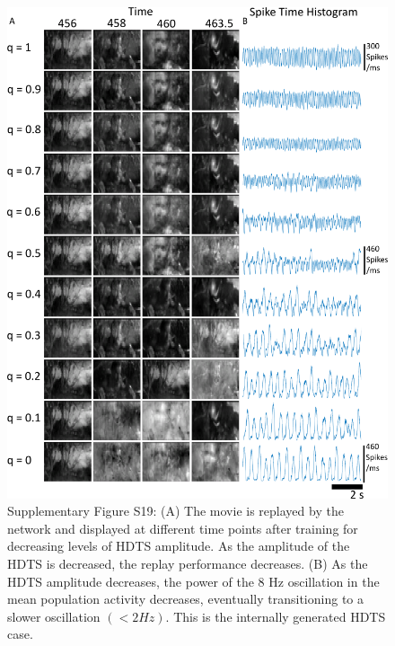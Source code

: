 \documentclass[11pt]{article} %
\begin{document}
\begin{figure}[htp!]
\centering
\includegraphics[scale=0.83]{FFIGS20}
\caption*{Supplementary Figure S19:  (A) The movie is replayed by the network and displayed at different time points after training for decreasing levels of HDTS amplitude.  As the amplitude of the HDTS is decreased, the replay performance decreases.  (B)  As the HDTS amplitude decreases, the power of the 8 Hz oscillation in the mean population activity decreases, eventually transitioning to a slower oscillation $(<2 Hz)$.  This is the internally generated HDTS case.   } 
\end{figure}
\end{document}
